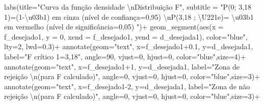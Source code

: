 \documentclass[
]{book}
\newenvironment{Shaded}{\begin{snugshade}}{\end{snugshade}}
\newcommand{\AttributeTok}[1]{\textcolor[rgb]{0.77,0.63,0.00}{#1}}
\newcommand{\DecValTok}[1]{\textcolor[rgb]{0.00,0.00,0.81}{#1}}
\newcommand{\FloatTok}[1]{\textcolor[rgb]{0.00,0.00,0.81}{#1}}
\newcommand{\FunctionTok}[1]{\textcolor[rgb]{0.00,0.00,0.00}{#1}}
\newcommand{\NormalTok}[1]{#1}
\newcommand{\SpecialCharTok}[1]{\textcolor[rgb]{0.00,0.00,0.00}{#1}}
\newcommand{\StringTok}[1]{\textcolor[rgb]{0.31,0.60,0.02}{#1}}
\begin{document}
\begin{Shaded}
\begin{Highlighting}[]
  \FunctionTok{labs}\NormalTok{(}\AttributeTok{title=}\StringTok{"Curva da função densidade }\SpecialCharTok{\textbackslash{}n}\StringTok{Distribuição F"}\NormalTok{, }
  \AttributeTok{subtitle =} \StringTok{"P(0; 3,18 1)=(1{-}\textbackslash{}u03b1) em cinza (nível de confiança=0,95) }\SpecialCharTok{\textbackslash{}n}\StringTok{P(3,18 ; \textbackslash{}U221e)= \textbackslash{}u03b1 em vermelho (nível de significância=0,05) "}\NormalTok{)}\SpecialCharTok{+}
  \FunctionTok{geom\_segment}\NormalTok{(}\FunctionTok{aes}\NormalTok{(}\AttributeTok{x =}\NormalTok{ f\_desejado1, }\AttributeTok{y =} \DecValTok{0}\NormalTok{, }\AttributeTok{xend =}\NormalTok{ f\_desejado1, }\AttributeTok{yend =}\NormalTok{ d\_desejada1), }\AttributeTok{color=}\StringTok{"blue"}\NormalTok{, }\AttributeTok{lty=}\DecValTok{2}\NormalTok{, }\AttributeTok{lwd=}\FloatTok{0.3}\NormalTok{)}\SpecialCharTok{+}
  \FunctionTok{annotate}\NormalTok{(}\AttributeTok{geom=}\StringTok{"text"}\NormalTok{, }\AttributeTok{x=}\NormalTok{f\_desejado1}\FloatTok{+0.1}\NormalTok{, }\AttributeTok{y=}\NormalTok{d\_desejada1, }\AttributeTok{label=}\StringTok{"F crítico 1=3,18"}\NormalTok{, }\AttributeTok{angle=}\DecValTok{90}\NormalTok{, }\AttributeTok{vjust=}\DecValTok{0}\NormalTok{, }\AttributeTok{hjust=}\DecValTok{0}\NormalTok{, }\AttributeTok{color=}\StringTok{"blue"}\NormalTok{,}\AttributeTok{size=}\DecValTok{4}\NormalTok{)}\SpecialCharTok{+}
 \FunctionTok{annotate}\NormalTok{(}\AttributeTok{geom=}\StringTok{"text"}\NormalTok{, }\AttributeTok{x=}\NormalTok{f\_desejado1}\SpecialCharTok{+}\DecValTok{1}\NormalTok{, }\AttributeTok{y=}\NormalTok{d\_desejada1, }\AttributeTok{label=}\StringTok{"Zona de rejeição }\SpecialCharTok{\textbackslash{}n}\StringTok{(para F calculado)"}\NormalTok{, }\AttributeTok{angle=}\DecValTok{0}\NormalTok{, }\AttributeTok{vjust=}\DecValTok{0}\NormalTok{, }\AttributeTok{hjust=}\DecValTok{0}\NormalTok{, }\AttributeTok{color=}\StringTok{"blue"}\NormalTok{,}\AttributeTok{size=}\DecValTok{3}\NormalTok{)}\SpecialCharTok{+}
  \FunctionTok{annotate}\NormalTok{(}\AttributeTok{geom=}\StringTok{"text"}\NormalTok{, }\AttributeTok{x=}\NormalTok{f\_desejado1}\DecValTok{{-}2}\NormalTok{, }\AttributeTok{y=}\NormalTok{d\_desejada1, }\AttributeTok{label=}\StringTok{"Zona de não rejeição  }\SpecialCharTok{\textbackslash{}n}\StringTok{(para F calculado)"}\NormalTok{, }\AttributeTok{angle=}\DecValTok{0}\NormalTok{, }\AttributeTok{vjust=}\DecValTok{0}\NormalTok{, }\AttributeTok{hjust=}\DecValTok{0}\NormalTok{, }\AttributeTok{color=}\StringTok{"blue"}\NormalTok{,}\AttributeTok{size=}\DecValTok{3}\NormalTok{)}\SpecialCharTok{+}

\end{Highlighting}
\end{Shaded}
\end{document}
